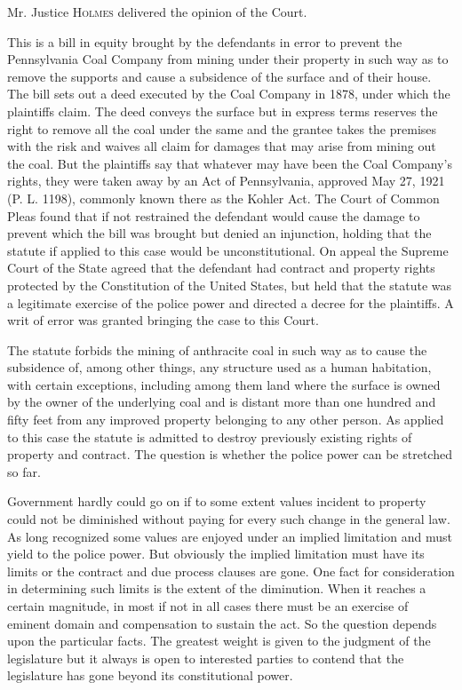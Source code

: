 

\opinion Mr. Justice \textsc{Holmes} delivered the opinion of the Court.

This is a bill in equity brought by the defendants in error to prevent the
Pennsylvania Coal Company from mining under their property in such way as to
remove the supports and cause a subsidence of the surface and of their house.
The bill sets out a deed executed by the Coal Company in 1878, under which the
plaintiffs claim. The deed conveys the surface but in express terms reserves the
right to remove all the coal under the same and the grantee takes the premises
with the risk and waives all claim for damages that may arise from mining out
the coal. But the plaintiffs say that whatever may have been the Coal Company's
rights, they were taken away by an Act of Pennsylvania, approved May 27, 1921
(P. L. 1198), commonly known there as the Kohler Act. The Court of Common Pleas
found that if not restrained the defendant would cause the damage to prevent
which the bill was brought but denied an injunction, holding that the statute if
applied to this case would be unconstitutional. On appeal the Supreme Court of
the State agreed that the defendant had contract and property rights protected
by the Constitution of the United States, but held that the statute was a
legitimate exercise of the police power and directed a decree for the
plaintiffs. A writ of error was granted bringing the case to this Court.

The statute forbids the mining of anthracite coal in such way as to cause the
subsidence of, among other things, any structure used as a human habitation,
with certain exceptions, including among them land where the surface is owned by
the owner of the underlying coal and is distant more than one hundred and fifty
feet from any improved property belonging to any other person. As applied to
this case the statute is admitted to destroy previously existing rights of
property and contract. The question is whether the police power can be stretched
so far.

Government hardly could go on if to some extent values incident to property
could not be diminished without paying for every such change in the general law.
As long recognized some values are enjoyed under an implied limitation and must
yield to the police power. But obviously the implied limitation must have its
limits or the contract and due process clauses are gone. One fact for
consideration in determining such limits is the extent of the diminution. When
it reaches a certain magnitude, in most if not in all cases there must be an
exercise of eminent domain and compensation to sustain the act. So the question
depends upon the particular facts. The greatest weight is given to the judgment
of the legislature but it always is open to interested parties to contend that
the legislature has gone beyond its constitutional power.

